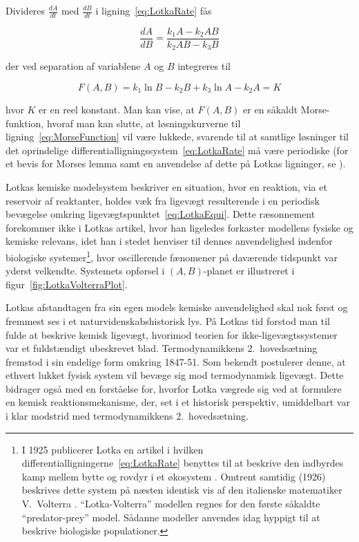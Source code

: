 Divideres $\frac{dA}{dt}$ med $\frac{dB}{dt}$ i
lig\-ning~\ref{eq:LotkaRate} f{\aa}s 

\begin{equation}
  \frac{dA}{dB} = \frac{k_1 A - k_2 A B}{k_2 A B - k_3 B}
\end{equation}

der ved separation af variablene $A$ og $B$ integreres til

\begin{equation}
  F(A,B) = k_1 \ln B - k_2 B + k_3 \ln A - k_2 A = K
  \label{eq:MorseFunction}
\end{equation}

hvor $K$ er en reel konstant. Man kan vise, at $F(A,B)$ er
en s{\aa}kaldt Morse-funktion, hvoraf man kan slutte, at
l{\o}sningskurverne til lig\-ning~\ref{eq:MorseFunction}
vil v{\ae}re lukkede, svarende til at samtlige l{\o}sninger
til det oprindelige
differentiallig\-ningssystem~\ref{eq:LotkaRate} m{\aa}
v{\ae}re periodiske (for et bevis for Morses lemma samt en
anvendelse af dette p{\aa} Lotkas lig\-ninger, se
\cite{Verhulst}).

\vspace{4.0mm}
Lotkas kemiske model\-system beskriver en situation, hvor
en reaktion, via et reservoir af reaktanter, holdes v{\ae}k
fra ligev{\ae}gt resulterende i en periodisk bev{\ae}gelse
omkring ligev{\ae}gts\-punktet~\ref{eq:LotkaEqui}. Dette
r{\ae}sonnement forekommer ikke i Lotkas artikel, hvor han
ligeledes forkaster modellens fysiske og kemiske relevans,
idet han i stedet henviser til dennes anvendelighed
indenfor biologiske systemer\footnote{I 1925 publicerer
Lotka en artikel i hvilken
differentialligningerne~\protect\ref{eq:LotkaRate} benyttes
til at beskrive den indbyrdes kamp mellem bytte og rovdyr i
et {\o}kosystem \cite{LotkaBio}. Omtrent samtidig (1926)
beskrives dette system p{\aa} n{\ae}sten identisk vis af
den italienske matematiker \mbox{V.\ Volterra}
\cite{Volterra}. ``Lotka-Volterra'' modellen regnes for den
f{\o}rste s{\aa}kaldte ``predator-prey'' model. S{\aa}danne
modeller anvendes idag hyppigt til at beskrive biologiske
populationer.}, hvor oscillerende f{\ae}nomener p{\aa}
dav{\ae}rende tidspunkt var yderst vel\-kendte. Systemets
opf{\o}rsel i $(A,B)$-planet er illustreret i
figur~\ref{fig:LotkaVolterraPlot}.

\vspace{4.0mm}
Lotkas afstandtagen fra sin egen models kemiske
anvendelighed skal nok f{\o}rst og fremmest ses i et
naturvidenskabshistorisk lys. P{\aa} Lotkas tid forstod man
til fulde at beskrive kemisk ligev{\ae}gt, hvorimod teorien
for ikke-ligev{\ae}gts\-systemer var et fuldst{\ae}ndigt
ubeskrevet blad. Termodynamikkens 2.~hoved\-s{\ae}tning
fremstod i sin endelige form omkring 1847-51. Som bekendt
postulerer denne, at ethvert lukket fysisk system vil
bev{\ae}ge sig mod termodynamisk ligev{\ae}gt. Dette
bidrager ogs{\aa} med en forst{\aa}else for, hvorfor Lotka
v{\ae}grede sig ved at formulere en kemisk
reaktions\-mekanisme, der, set i et historisk perspektiv,
umiddelbart var i klar modstrid med termodynamikkens 2.\
hoveds{\ae}tning.


